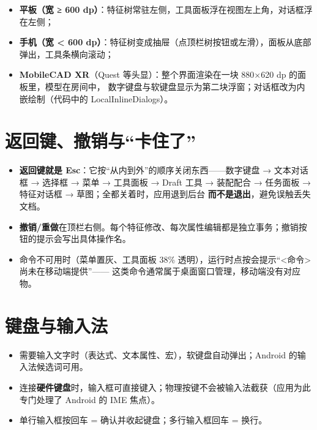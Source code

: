\begin{itemize}
  \item \textbf{平板（宽 ≥ 600 dp）}：特征树常驻左侧，工具面板浮在视图左上角，对话框浮在左侧；
  \item \textbf{手机（宽 < 600 dp）}：特征树变成抽屉（点顶栏树按钮或左滑），面板从底部弹出，工具条横向滚动；
  \item \textbf{MobileCAD XR}（Quest 等头显）：整个界面渲染在一块 880×620 dp 的面板里，模型在房间中，
        数字键盘与软键盘显示为第二块浮窗；对话框改为内嵌绘制（代码中的 LocalInlineDialogs）。
\end{itemize}

\section{返回键、撤销与“卡住了”}

\begin{itemize}
  \item \textbf{返回键就是 Esc}：它按“从内到外”的顺序关闭东西——数字键盘 → 文本对话框 → 选择框 → 菜单 →
        工具面板 → Draft 工具 → 装配配合 → 任务面板 → 特征对话框 → 草图；全都关着时，应用退到后台
        \textbf{而不是退出}，避免误触丢失文档。
  \item \textbf{撤销/重做}在顶栏右侧。每个特征修改、每次属性编辑都是独立事务；撤销按钮的提示会写出具体操作名。
  \item 命令不可用时（菜单置灰、工具面板 38\% 透明），运行时点按会提示“<命令> 尚未在移动端提供”——
        这类命令通常属于桌面窗口管理，移动端没有对应物。
\end{itemize}

\section{键盘与输入法}

\begin{itemize}
  \item 需要输入文字时（表达式、文本属性、宏），软键盘自动弹出；Android 的输入法候选词可用。
  \item 连接\textbf{硬件键盘}时，输入框可直接键入；物理按键不会被输入法截获（应用为此专门处理了 Android 的 IME 焦点）。
  \item 单行输入框按回车 = 确认并收起键盘；多行输入框回车 = 换行。
\end{itemize}
